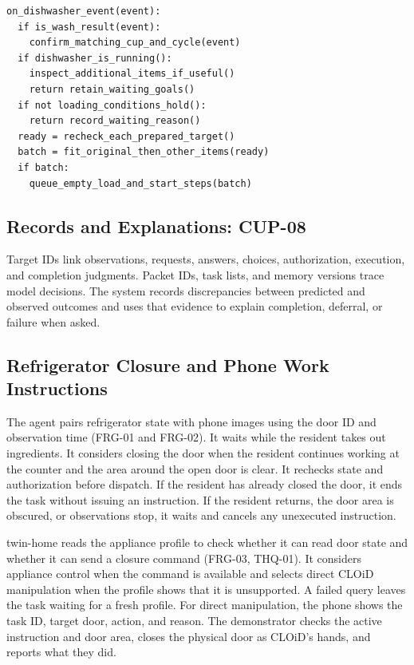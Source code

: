 \documentclass[conference,a4paper]{IEEEtran}
\begin{document}
\begingroup\footnotesize
\begin{verbatim}
on_dishwasher_event(event):
  if is_wash_result(event):
    confirm_matching_cup_and_cycle(event)
  if dishwasher_is_running():
    inspect_additional_items_if_useful()
    return retain_waiting_goals()
  if not loading_conditions_hold():
    return record_waiting_reason()
  ready = recheck_each_prepared_target()
  batch = fit_original_then_other_items(ready)
  if batch:
    queue_empty_load_and_start_steps(batch)
\end{verbatim}
\endgroup

\subsection{Records and Explanations: CUP-08}

Target IDs link observations, requests, answers, choices, authorization, execution, and completion judgments. Packet IDs, task lists, and memory versions trace model decisions. The system records discrepancies between predicted and observed outcomes and uses that evidence to explain completion, deferral, or failure when asked.

\subsection{Refrigerator Closure and Phone Work Instructions}

The agent pairs refrigerator state with phone images using the door ID and observation time (FRG-01 and FRG-02). It waits while the resident takes out ingredients. It considers closing the door when the resident continues working at the counter and the area around the open door is clear. It rechecks state and authorization before dispatch. If the resident has already closed the door, it ends the task without issuing an instruction. If the resident returns, the door area is obscured, or observations stop, it waits and cancels any unexecuted instruction.

twin-home reads the appliance profile to check whether it can read door state and whether it can send a closure command (FRG-03, THQ-01). It considers appliance control when the command is available and selects direct CLOiD manipulation when the profile shows that it is unsupported. A failed query leaves the task waiting for a fresh profile. For direct manipulation, the phone shows the task ID, target door, action, and reason. The demonstrator checks the active instruction and door area, closes the physical door as CLOiD's hands, and reports what they did.
\end{document}
